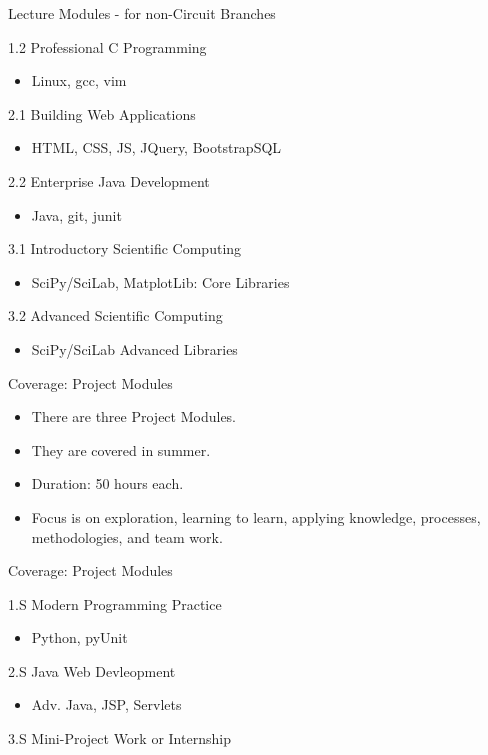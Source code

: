 \documentclass[12pt]{beamer}
\begin{document}
{\begin{frame}{Lecture Modules - for non-Circuit Branches} 
  \begin{description}[WWW]
  \item[PCP] 1.2 Professional C Programming
    \begin{itemize}
      \item Linux, gcc, vim
    \end{itemize}
  \item[BWA] 2.1 Building Web Applications
    \begin{itemize}
      \item HTML, CSS, JS, JQuery, BootstrapSQL
    \end{itemize}
  \item[EJD] 2.2 Enterprise Java Development 
    \begin{itemize}
    \item Java, git, junit 
    \end{itemize}
  \item[ISC] 3.1 Introductory Scientific Computing 
    \begin{itemize}
      \item SciPy/SciLab, MatplotLib: Core Libraries
    \end{itemize}
  \item[ASC] 3.2 Advanced Scientific Computing
    \begin{itemize}
      \item SciPy/SciLab Advanced Libraries
    \end{itemize}
  \end{description}
\end{frame}

\begin{frame}{Coverage: Project Modules}
  \begin{itemize}
  \item There are three Project Modules. 
  \item They are covered in summer. 
  \item Duration: 50 hours each.
  \item Focus is on exploration, learning to learn, applying knowledge, processes, methodologies, and team work.
  \end{itemize}
\end{frame}

\begin{frame}{Coverage: Project Modules}
  \begin{description}[WWW]
  \item[MPP] 1.S Modern Programming Practice
    \begin{itemize}
    \item Python, pyUnit
    \end{itemize} 
  \item[JWD] 2.S Java Web Devleopment
    \begin{itemize}
    \item Adv. Java, JSP, Servlets
    \end{itemize} 
  \item[MPW] 3.S Mini-Project Work or Internship
  \end{description}
\end{frame}

}
\end{document}
